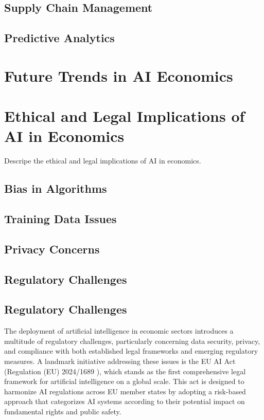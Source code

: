 \subsection{Supply Chain Management}

\subsection{Predictive Analytics}


\section{Future Trends in AI Economics}


\section{Ethical and Legal Implications of AI in Economics}

Descripe the ethical and legal implications of AI in economics.

\subsection{Bias in Algorithms}

\subsection{Training Data Issues}

\subsection{Privacy Concerns}

\subsection{Regulatory Challenges}

\subsection{Regulatory Challenges}

The deployment of artificial intelligence in economic sectors introduces a multitude of regulatory challenges, particularly concerning data security, privacy, and compliance with both established legal frameworks and emerging regulatory measures. A landmark initiative addressing these issues is the EU AI Act (Regulation (EU) 2024/1689 \cite{EU-AI-Act-text}), which stands as the first comprehensive legal framework for artificial intelligence on a global scale. This act is designed to harmonize AI regulations across EU member states by adopting a risk-based approach that categorizes AI systems according to their potential impact on fundamental rights and public safety.

